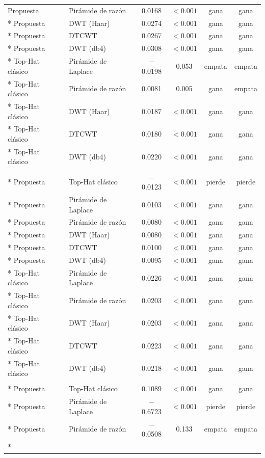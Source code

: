 {\begin{longtable}{llcccc}
Propuesta & Pirámide de razón & 0.0168 & $< 0.001$ & gana & gana \\*
Propuesta & DWT (Haar) & 0.0274 & $< 0.001$ & gana & gana \\*
Propuesta & DTCWT & 0.0267 & $< 0.001$ & gana & gana \\*
Propuesta & DWT (db4) & 0.0308 & $< 0.001$ & gana & gana \\*
Top-Hat clásico & Pirámide de Laplace & $-$0.0198 & 0.053 & empata & empata \\*
Top-Hat clásico & Pirámide de razón & 0.0081 & 0.005 & gana & empata \\*
Top-Hat clásico & DWT (Haar) & 0.0187 & $< 0.001$ & gana & gana \\*
Top-Hat clásico & DTCWT & 0.0180 & $< 0.001$ & gana & gana \\*
Top-Hat clásico & DWT (db4) & 0.0220 & $< 0.001$ & gana & gana \\
\addlinespace \multicolumn{6}{l}{\textit{Gradiente medio (MG)}} \\*
Propuesta & Top-Hat clásico & $-$0.0123 & $< 0.001$ & pierde & pierde \\*
Propuesta & Pirámide de Laplace & 0.0103 & $< 0.001$ & gana & gana \\*
Propuesta & Pirámide de razón & 0.0080 & $< 0.001$ & gana & gana \\*
Propuesta & DWT (Haar) & 0.0080 & $< 0.001$ & gana & gana \\*
Propuesta & DTCWT & 0.0100 & $< 0.001$ & gana & gana \\*
Propuesta & DWT (db4) & 0.0095 & $< 0.001$ & gana & gana \\*
Top-Hat clásico & Pirámide de Laplace & 0.0226 & $< 0.001$ & gana & gana \\*
Top-Hat clásico & Pirámide de razón & 0.0203 & $< 0.001$ & gana & gana \\*
Top-Hat clásico & DWT (Haar) & 0.0203 & $< 0.001$ & gana & gana \\*
Top-Hat clásico & DTCWT & 0.0223 & $< 0.001$ & gana & gana \\*
Top-Hat clásico & DWT (db4) & 0.0218 & $< 0.001$ & gana & gana \\
\addlinespace \multicolumn{6}{l}{\textit{Información mutua (MI)}} \\*
Propuesta & Top-Hat clásico & 0.1089 & $< 0.001$ & gana & gana \\*
Propuesta & Pirámide de Laplace & $-$0.6723 & $< 0.001$ & pierde & pierde \\*
Propuesta & Pirámide de razón & $-$0.0508 & 0.133 & empata & empata \\*

\end{longtable}}
